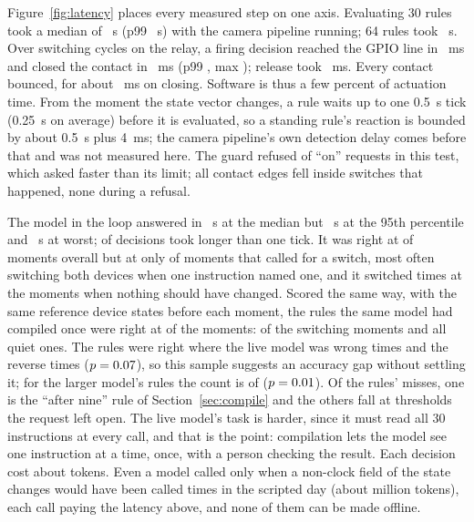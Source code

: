 \documentclass[conference]{IEEEtran}
\begin{document}
Figure~\ref{fig:latency} places every measured step on one axis. Evaluating 30
rules took a median of \evalThirtyMed~\textmu s (p99 \evalThirtyNinetyNine~\textmu s)
with the camera pipeline running; 64 rules took \evalSixtyFourMed~\textmu s.
Over \relayOnN{} switching cycles on the relay, a firing decision reached the
GPIO line in \relayOnGpio~ms and closed the contact in \relayOnMed~ms (p99
\relayOnNinetyNine, max \relayOnMax); release took \relayOffMed~ms. Every
contact bounced, for about \relayOnBounce~ms on closing. Software is thus a few
percent of actuation time. From the moment the state vector changes, a rule
waits up to one 0.5~s tick (0.25~s on average) before it is evaluated, so a
standing rule's reaction is bounded by about 0.5~s plus 4~ms; the camera
pipeline's own detection delay comes before that and was not measured here. The guard refused \relayHeld{} of \relayRequestedOn{}
``on'' requests in this test, which asked faster than its limit; all
\relayEdges{} contact edges fell inside switches that happened, none during a
refusal.

The model in the loop answered in \blMed~s at the median but \blNinetyFive~s at
the 95th percentile and \blMax~s at worst; \blSlow{} of \blN{} decisions took
longer than one tick. It was right at \blCorrect{} of \blN{} moments overall but
at only \blEdgeCorrect{} of \blEdges{} moments that called for a switch, most
often switching both devices when one instruction named one, and it switched
\blSpurious{} times at the \blQuiet{} moments when nothing should have changed.
Scored the same way, with the same reference device states before each
moment, the rules the same model had compiled once were right at \momRules{}
of the \blN{} moments: \momRulesEdge{} of the \blEdges{} switching moments
and all \blQuiet{} quiet ones. The rules were right where the live model was
wrong \momRulesOnly{} times and the reverse \momRulesOnlyModel{} times
($p=0.07$), so this sample suggests an accuracy gap without settling
it; for the larger model's rules the count is \momUltra{} of \blN{}
($p=0.01$). Of the rules' \momRulesMissed{} misses, one is the ``after
nine'' rule of Section~\ref{sec:compile} and the others fall at thresholds the
request left open. The live model's task is harder, since it must
read all 30 instructions at every call, and that is the point: compilation
lets the model see one instruction at a time, once, with a person checking
the result. Each decision cost about \blTokens{} tokens. Even a model called only when a
non-clock field of the state changes would have been called \blEvents{} times
in the scripted day (about \blEventTokens{} million tokens), each call paying
the latency above, and none of them can be made offline.
\end{document}
